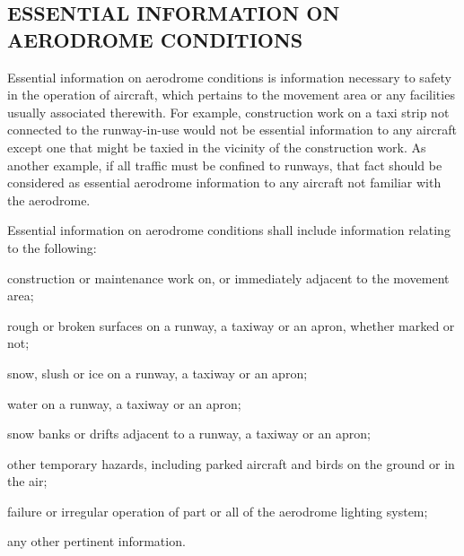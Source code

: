 \subsection[Essential information on aerodrome conditions]{ESSENTIAL INFORMATION ON AERODROME CONDITIONS}

\begin{enumempty}[labelindent=\parindent]
    \item {}
\end{enumempty}

\begin{enumnoss}
    \item \label{7.5.1} Essential information on aerodrome conditions is information necessary to safety in the operation of aircraft, which pertains to the movement area or any facilities usually associated therewith. For example, construction work on a taxi strip not connected to the runway-in-use would not be essential information to any aircraft except one that might be taxied in the vicinity of the construction work. As another example, if all traffic must be confined to runways, that fact should be considered as essential aerodrome information to any aircraft not familiar with the aerodrome.
    \item \label{7.5.2} Essential information on aerodrome conditions shall include information relating to the following:

    \begin{enumalph}
        \item construction or maintenance work on, or immediately adjacent to the movement area;
        \item rough or broken surfaces on a runway, a taxiway or an apron, whether marked or not;
        \item snow, slush or ice on a runway, a taxiway or an apron;
        \item water on a runway, a taxiway or an apron;
        \item snow banks or drifts adjacent to a runway, a taxiway or an apron;
        \item other temporary hazards, including parked aircraft and birds on the ground or in the air;
        \item failure or irregular operation of part or all of the aerodrome lighting system;
        \item any other pertinent information.
    \end{enumalph}


\end{enumnoss}
